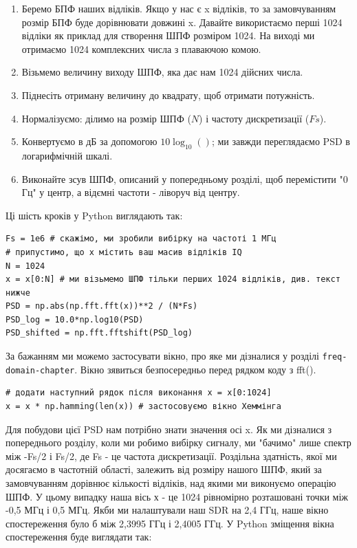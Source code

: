 \begin{enumerate}
\def\labelenumi{\arabic{enumi}.}
\tightlist
\item
  Беремо БПФ наших відліків. Якщо у нас є x відліків, то за
  замовчуванням розмір БПФ буде дорівнювати довжині x. Давайте
  використаємо перші 1024 відліки як приклад для створення ШПФ розміром
  1024. На виході ми отримаємо 1024 комплексних числа з плаваючою комою.
\item
  Візьмемо величину виходу ШПФ, яка дає нам 1024 дійсних числа.
\item
  Піднесіть отриману величину до квадрату, щоб отримати потужність.
\item
  Нормалізуємо: ділимо на розмір ШПФ (\(N\)) і частоту дискретизації
  (\(Fs\)).
\item
  Конвертуємо в дБ за допомогою \(10 \log_{10}()\); ми завжди
  переглядаємо PSD в логарифмічній шкалі.
\item
  Виконайте зсув ШПФ, описаний у попередньому розділі, щоб перемістити
  "0 Гц" у центр, а від\textquotesingle ємні частоти - ліворуч від
  центру.
\end{enumerate}

Ці шість кроків у Python виглядають так:

\begin{Verbatim}[breaklines=true,breakanywhere=true,fontsize=\small]
Fs = 1e6 # скажімо, ми зробили вибірку на частоті 1 МГц
# припустимо, що x містить ваш масив відліків IQ
N = 1024
x = x[0:N] # ми візьмемо ШПФ тільки перших 1024 відліків, див. текст нижче
PSD = np.abs(np.fft.fft(x))**2 / (N*Fs)
PSD_log = 10.0*np.log10(PSD)
PSD_shifted = np.fft.fftshift(PSD_log)
\end{Verbatim}

За бажанням ми можемо застосувати вікно, про яке ми дізналися у розділі
\texttt{freq-domain-chapter}. Вікно з\textquotesingle явиться
безпосередньо перед рядком коду з fft().

\begin{Verbatim}[breaklines=true,breakanywhere=true,fontsize=\small]
# додати наступний рядок після виконання x = x[0:1024]
x = x * np.hamming(len(x)) # застосовуємо вікно Хеммінга
\end{Verbatim}

Для побудови цієї PSD нам потрібно знати значення осі x. Як ми дізналися
з попереднього розділу, коли ми робимо вибірку сигналу, ми "бачимо" лише
спектр між -Fs/2 і Fs/2, де Fs - це частота дискретизації. Роздільна
здатність, якої ми досягаємо в частотній області, залежить від розміру
нашого ШПФ, який за замовчуванням дорівнює кількості відліків, над якими
ми виконуємо операцію ШПФ. У цьому випадку наша вісь х - це 1024
рівномірно розташовані точки між -0,5 МГц і 0,5 МГц. Якби ми налаштували
наш SDR на 2,4 ГГц, наше вікно спостереження було б між 2,3995 ГГц і
2,4005 ГГц. У Python зміщення вікна спостереження буде виглядати так:

